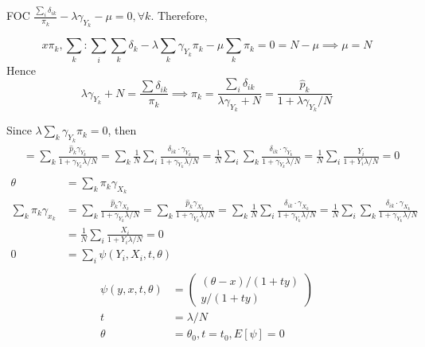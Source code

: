 \documentclass[11pt, a4paper, oneside]{article}
\theoremstyle{definition}
\theoremstyle{proposition}
\theoremstyle{corollary}
\theoremstyle{lemma}
\theoremstyle{theorem}
\begin{document}
FOC $\frac{\sum_i \delta_{ik}}{\pi_k} -\lambda \gamma_{Y_k} - \mu = 0, \forall k$. Therefore, 

$$x\pi_k, \sum_k: \sum_i\sum_k \delta_k - \lambda \sum_k\gamma_{Y_k}\pi_k - \mu\sum_k\pi_k = 0 = N -\mu \implies \mu = N$$
Hence $$\lambda\gamma_{Y_k} + N = \frac{\sum \delta_{ik}}{\pi_k} \implies \pi_k = \frac{\sum_i \delta_{ik}}{\lambda\gamma_{Y_k}+N} = \frac{\hat{p}_k}{1+\lambda \gamma_{Y_k}/N}$$ 

Since $\lambda\sum_k \gamma_{Y_k}\pi_k = 0$, then
\begin{align*}
&= \sum_k \frac{\hat{p}_k\gamma_{Y_k}}{1+\gamma_{Y_k}\lambda/N} =\sum_k\frac{1}{N}\sum_i \frac{\delta_{ik}\cdot \gamma_{Y_k}}{1+\gamma_{Y_k}\lambda/N} =\frac{1}{N}\sum_i\sum_k \frac{\delta_{ik}\cdot \gamma_{Y_k}}{1+\gamma_{Y_k}\lambda/N} =\frac{1}{N}\sum_i\frac{Y_i}{1+Y_i\lambda/N} = 0\\
\end{align*}
\begin{align*}
\theta & = \sum_k \pi_k\gamma_{X_k}\\
\sum_k \pi_k\gamma_{x_k} &= \sum_k \frac{\hat{p}_k\gamma_{X_k}}{1+\gamma_{Y_k}\lambda/N}= \sum_k \frac{\hat{p}_k\gamma_{X_k}}{1+\gamma_{Y_k}\lambda/N} =\sum_k\frac{1}{N}\sum_i \frac{\delta_{ik}\cdot \gamma_{X_k}}{1+\gamma_{Y_k}\lambda/N} =\frac{1}{N}\sum_i\sum_k \frac{\delta_{ik}\cdot \gamma_{X_k}}{1+\gamma_{Y_k}\lambda/N} \\
&=\frac{1}{N}\sum_i\frac{X_i}{1+Y_i\lambda/N} = 0\\
0 &=\sum_i \psi(Y_i, X_i, t, \theta)\\
\end{align*}
\begin{align*}
\psi(y, x, t, \theta) &=\begin{pmatrix} (\theta - x)/(1+ty)\\ y/(1+ty)\end{pmatrix}\\
t & = \lambda/N\\
\theta &=\theta_0, t = t_0, E[\psi] = 0
\end{align*} 
\end{document}
